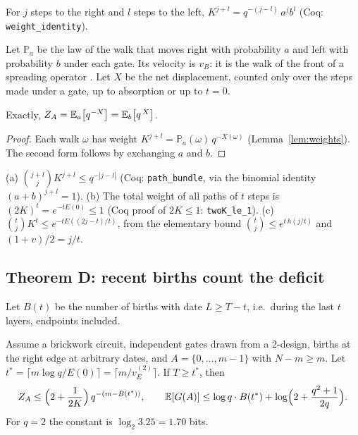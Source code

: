 \begin{lemma}\label{lem:weights}
For $j$ steps to the right and $l$ steps to the left, $K^{j+l}=q^{-(j-l)}\,a^j b^l$ (Coq: \texttt{weight\_identity}).
\end{lemma}

Let $\mathbb{P}_a$ be the law of the walk that moves right with probability $a$ and left with probability $b$ under each gate. Its velocity is $v_B$: it is the walk of the front of a spreading operator \cite{NVH2018,vK2018}. Let $X$ be the net displacement, counted only over the steps made under a gate, up to absorption or up to $t=0$.

\begin{corollary}\label{cor:proba}
Exactly, $Z_A=\mathbb{E}_a\bigl[q^{-X}\bigr]=\mathbb{E}_b\bigl[q^{\,X}\bigr]$.
\end{corollary}
\begin{proof}
Each walk $\omega$ has weight $K^{j+l}=\mathbb{P}_a(\omega)\,q^{-X(\omega)}$ (Lemma~\ref{lem:weights}). The second form follows by exchanging $a$ and $b$.
\end{proof}

\begin{lemma}[bundle]\label{lem:bundle}
(a) $\binom{j+l}{j}K^{j+l}\le q^{-|j-l|}$ (Coq: \texttt{path\_bundle}, via the binomial identity $(a+b)^{j+l}=1$).
(b) The total weight of all paths of $t$ steps is $(2K)^t=e^{-tE(0)}\le1$ (Coq proof of $2K\le1$: \texttt{twoK\_le\_1}).
(c) $\binom{t}{j}K^t\le e^{-tE((2j-t)/t)}$, from the elementary bound $\binom tj\le e^{t\,h(j/t)}$ and $(1+v)/2=j/t$.
\end{lemma}

\subsection{Theorem D: recent births count the deficit}

Let $B(t)$ be the number of births with date $L\ge T-t$, i.e.\ during the last $t$ layers, endpoints included.

\begin{theoremL}\label{thm:D}
Assume a brickwork circuit, independent gates drawn from a 2-design, births at the right edge at arbitrary dates, and $A=\{0,\dots,m-1\}$ with $N-m\ge m$. Let $t^\ast=\lceil m\log q/E(0)\rceil=\lceil m/v_E^{(2)}\rceil$. If $T\ge t^\ast$, then
\begin{equation}\label{eq:thD}
Z_A\le\Bigl(2+\frac{1}{2K}\Bigr)\,q^{-(m-B(t^\ast))},\qquad
\mathbb{E}[G(A)]\le\log q\cdot B(t^\ast)+\log\Bigl(2+\frac{q^2+1}{2q}\Bigr).
\end{equation}
For $q=2$ the constant is $\log_2 3.25=1.70$ bits.
\end{theoremL}

